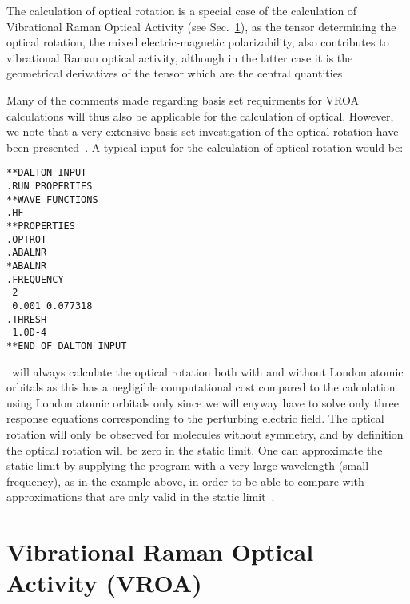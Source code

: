 The calculation of optical rotation is a special case of the
calculation of Vibrational Raman Optical Activity (see
Sec.~\ref{sec:vroa}), as the tensor determining the optical rotation,
the mixed electric-magnetic polarizability, also contributes to
vibrational Raman optical activity, although in the latter case it is the
geometrical derivatives of the tensor which are the central quantities.

Many of the comments made regarding basis set requirments for VROA
calculations will thus also be applicable for the calculation of
optical. However, we note that a very extensive basis set
investigation of the optical rotation have been
presented~\cite{jrcmjffjdpjsjpca104}.
A typical input for the calculation of optical rotation would
be:

\begin{verbatim}
**DALTON INPUT
.RUN PROPERTIES
**WAVE FUNCTIONS
.HF
**PROPERTIES
.OPTROT
.ABALNR
*ABALNR
.FREQUENCY
 2
 0.001 0.077318
.THRESH
 1.0D-4
**END OF DALTON INPUT
\end{verbatim}

\dalton\ will always calculate the optical rotation both with and
without London atomic orbitals as this has a negligible computational
cost compared to the calculation using London atomic orbitals only
since we will enyway have to solve only three response equations
corresponding to the perturbing electric field. The optical rotation
will only be 
observed for molecules without symmetry, and by definition the optical
rotation will be zero in the static limit. One can approximate the
static limit by supplying the program with a very large wavelength
(small frequency), as in the example above, in order to be able to
compare with approximations that are only valid in the static
limit~\cite{rdacpl87,jrcmjffjdpjsjpca104}. 

\section{Vibrational Raman Optical Activity (VROA)}\label{sec:vroa}

\begin{center}
\end{center}

